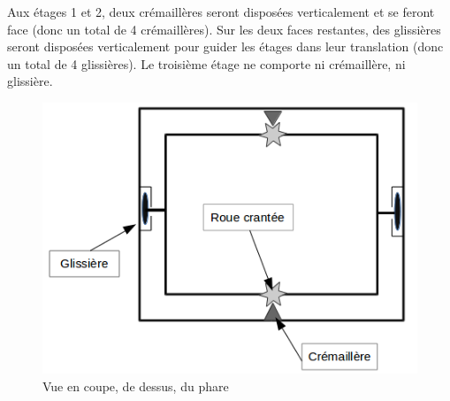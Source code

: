 \documentclass{article}
\begin{document}
\pagebreak

Aux étages 1 et 2, deux crémaillères seront disposées verticalement et se feront face (donc un total de 4
crémaillères). Sur les deux faces restantes, des glissières seront disposées verticalement pour guider les
étages dans leur translation (donc un total de 4 glissières). Le troisième étage ne comporte ni crémaillère,
ni glissière.


\begin{figure}[!h]
\centering
\includegraphics[scale=0.7]{Pictures/Schema_phare2.png}
\caption{Vue en coupe, de dessus, du phare}
\end{figure}
\end{document}
